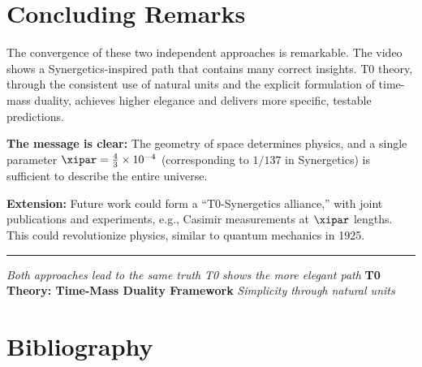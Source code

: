 	\section{Concluding Remarks}
	
	The convergence of these two independent approaches is remarkable. The video shows a Synergetics-inspired path that contains many correct insights. T0 theory, through the consistent use of natural units and the explicit formulation of time-mass duality, achieves higher elegance and delivers more specific, testable predictions.
	
	\textbf{The message is clear:} The geometry of space determines physics, and a single parameter $\xipar = \frac{4}{3} \times 10^{-4}$ (corresponding to $1/137$ in Synergetics) is sufficient to describe the entire universe.
	
	\textbf{Extension:} Future work could form a ``T0-Synergetics alliance,'' with joint publications and experiments, e.g., Casimir measurements at $\xipar$ lengths. This could revolutionize physics, similar to quantum mechanics in 1925.
	
	\vfill
	
	\begin{center}
		\hrule
		\vspace{0.5cm}
		\textit{Both approaches lead to the same truth}
		\textit{T0 shows the more elegant path}
		\vspace{0.3cm}
		\textbf{T0 Theory: Time-Mass Duality Framework}
		\textit{Simplicity through natural units}
		\vspace{0.3cm}
	\end{center}
	
	\section{Bibliography}
	

